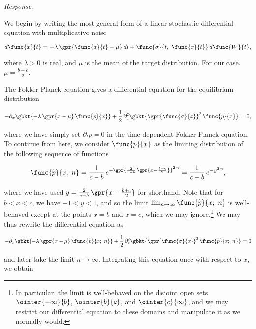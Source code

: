 \textit{Response.} 

We begin by writing the most general form of a linear stochastic differential equation with multiplicative noise

\begin{equation}
	d \func{x}{t} = -\lambda\,\gpr{\func{x}{t} - \mu}\,dt + \func{\sigma}{t,\ \func{x}{t}}\,d \func{W}{t},
\end{equation}

where $\lambda > 0$ is real, and $\mu$ is the mean of the target distribution. For our case, $\mu = \frac{b + c}{2}$.

The Fokker-Planck equation gives a differential equation for the equilibrium distribution

\begin{equation}
	-\partial_{x} \gbkt{-\lambda\,\gpr{x - \mu}\,\func{p}{x}} + \frac{1}{2}\,\partial_x^2 \gbkt{\gpr{\func{\sigma}{x}}^2\,\func{p}{x}} = 0,
\end{equation}

where we have simply set $\partial_t p = 0$ in the time-dependent Fokker-Planck equation. To continue from here, we consider $\func{p}{x}$ as the limiting distribution of the following sequence of functions

\begin{equation}
	\func{\widetilde{p}}{x;\ n} = \frac{1}{c - b}\,e^{-\gpr{\frac{2}{c - b}\,\gpr{x - \frac{b + c}{2}}}^{2\,n}} = \frac{1}{c - b}\,e^{-y^{2\,n}},
\end{equation}

where we have used $y = \frac{2}{c - b}\,\gpr{x - \frac{b + c}{2}}$ for shorthand. Note that for $b < x < c$, we have $-1 < y < 1$, and so the limit $\lim_{n \to \infty} \func{\widetilde{p}}{x;\ n}$ is well-behaved except at the points $x = b$ and $x = c$, which we may ignore.\footnote{In particular, the limit is well-behaved on the disjoint open sets $\ointer{-\infty}{b}$, $\ointer{b}{c}$, and $\ointer{c}{\infty}$, and we may restrict our differential equation to these domains and manipulate it as we normally would.} We may thus rewrite the differential equation as

\begin{equation}
	-\partial_{x} \gbkt{-\lambda\,\gpr{x - \mu}\,\func{\widetilde{p}}{x;\ n}} + \frac{1}{2}\,\partial_x^2 \gbkt{\gpr{\func{\sigma}{x}}^2\,\func{\widetilde{p}}{x;\ n}} = 0
\end{equation}

and later take the limit $n \to \infty$. Integrating this equation once with respect to $x$, we obtain

